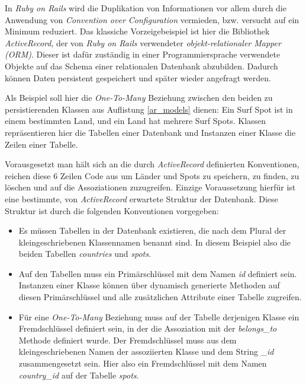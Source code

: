 In \textit{Ruby on Rails} wird die Duplikation von Informationen vor
allem durch die Anwendung von \textit{Convention over Configuration}
vermieden, bzw. versucht auf ein Minimum reduziert. Das klassiche
Vorzeigebeispiel ist hier die Bibliothek \textit{ActiveRecord}, der
von \textit{Ruby on Rails} verwendeter \textit{objekt-relationaler
  Mapper (ORM)}. Dieser ist dafür zuständig in einer
Programmiersprache verwendete Objekte auf das Schema einer
relationalen Datenbank abzubilden. Dadurch können Daten persistent
gespeichert und später wieder angefragt werden.

Als Beispiel soll hier die \textit{One-To-Many} Beziehung zwischen den
beiden zu persistierenden Klassen aus Auflistung \ref{ar_models}
dienen: Ein Surf Spot ist in einem bestimmten Land, und ein Land hat
mehrere Surf Spots. Klassen repräsentieren hier die Tabellen einer
Datenbank und Instanzen einer Klasse die Zeilen einer Tabelle.



Vorausgesetzt man hält sich an die durch \textit{ActiveRecord}
definierten Konventionen, reichen diese 6 Zeilen Code aus um Länder
und Spots zu speichern, zu finden, zu löschen und auf die
Assoziationen zuzugreifen. Einzige Voraussetzung hierfür ist eine
bestimmte, von \textit{ActiveRecord} erwartete Struktur der
Datenbank. Diese Struktur ist durch die folgenden Konventionen
vorgegeben:

\begin{itemize}
\item Es müssen Tabellen in der Datenbank existieren, die nach dem
  Plural der kleingeschriebenen Klassennamen benannt sind. In diesem
  Beispiel also die beiden Tabellen \textit{countries} und
  \textit{spots}.
\item Auf den Tabellen muss ein Primärschlüssel mit dem Namen
  \textit{id} definiert sein. Instanzen einer Klasse können über
  dynamisch generierte Methoden auf diesen Primärschlüssel und alle
  zusätzlichen Attribute einer Tabelle zugreifen.
\item Für eine \textit{One-To-Many} Beziehung muss auf der Tabelle
  derjenigen Klasse ein Fremdschlüssel definiert sein, in der die
  Assoziation mit der \textit{belongs\_to} Methode definiert
  wurde. Der Fremdschlüssel muss aus dem kleingeschriebenen Namen der
  assoziierten Klasse und dem String \textit{\_id} zusammengesetzt
  sein. Hier also ein Fremdschlüssel mit dem Namen
  \textit{country\_id} auf der Tabelle \textit{spots}.
\end{itemize}


